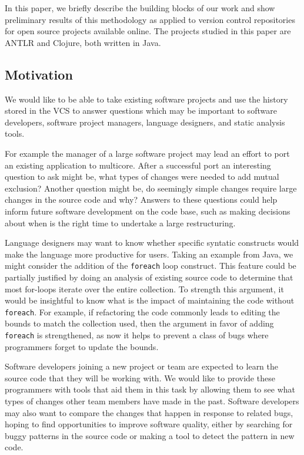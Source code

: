 In this paper, we briefly describe the building blocks of our work and show
preliminary results of this methodology as applied to version control
repositories for open source projects available online.  The projects studied
in this paper are ANTLR and Clojure, both written in Java.

\subsection{Motivation}

We would like to be able to take existing software projects and use the history
stored in the VCS to answer questions which may be important to software
developers, software project managers, language designers, and static analysis
tools.

For example the manager of a large software project may lead an effort to port
an existing application to multicore.  After a successful port an interesting
question to ask might be, what types of changes were needed to add mutual
exclusion? Another question might be, do seemingly simple changes require large
changes in the source code and why?  Answers to these questions could help
inform future software development on the code base, such as making decisions
about when is the right time to undertake a large restructuring.

Language designers may want to know whether specific syntatic constructs would
make the language more productive for users. Taking an example from Java, we
might consider the addition of the {\tt foreach} loop construct. This feature
could be partially justified by doing an analysis of existing source code to
determine that most for-loops iterate over the entire collection. To strength
this argument, it would be insightful to know what is the impact of maintaining
the code without {\tt foreach}. For example, if refactoring the code commonly
leads to editing the bounds to match the collection used, then the argument in
favor of adding {\tt foreach} is strengthened, as now it helps to prevent a
class of bugs where programmers forget to update the bounds.

Software developers joining a new project or team are expected to learn the
source code that they will be working with. We would like to provide these
programmers with tools that aid them in this task by allowing them to see what
types of changes other team members have made in the past. Software developers
may also want to compare the changes that happen in response to related bugs,
hoping to find opportunities to improve software quality, either by searching
for buggy patterns in the source code or making a tool to detect the pattern in
new code.

